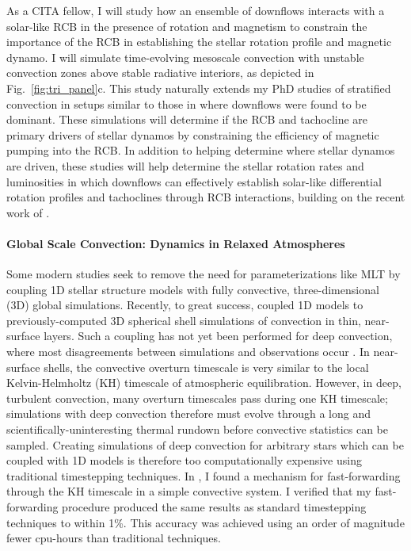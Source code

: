 \documentclass[preprint, hmargin=1in, vmargin=1in]{aastex62}
\begin{document}
As a CITA fellow, I will study how an ensemble of downflows interacts with a solar-like RCB in the presence of rotation and magnetism to constrain the importance of the RCB in establishing the stellar rotation profile and magnetic dynamo.
I will simulate time-evolving mesoscale convection with unstable convection zones above stable radiative interiors, as depicted in Fig.~\ref{fig:tri_panel}c.
This study naturally extends my PhD studies of stratified convection \citep{anders&brown2017, anders&all2019} in setups similar to those in \citet{kapyla&all2017} where downflows were found to be dominant. 
These simulations will determine if the RCB and tachocline are primary drivers of stellar dynamos by constraining the efficiency of magnetic pumping into the RCB.
In addition to helping determine where stellar dynamos are driven, these studies will help determine the stellar rotation rates and luminosities in which downflows can effectively establish solar-like differential rotation profiles and tachoclines through RCB interactions, building on the recent work of \citet{wood&brummell2018}.

\paragraph{Global Scale Convection: Dynamics in Relaxed Atmospheres}
Some modern studies seek to remove the need for parameterizations like MLT by coupling 1D stellar structure models with fully convective, three-dimensional (3D) global simulations.
Recently, to great success, \citet{jorgensen&weiss2019} coupled 1D models to previously-computed 3D spherical shell simulations of convection in thin, near-surface layers.
Such a coupling has not yet been performed for deep convection, where most disagreements between simulations and observations occur \citep[the Convective Conundrum,][]{hanasoge&all2015}.
In near-surface shells, the convective overturn timescale is very similar to the local Kelvin-Helmholtz (KH) timescale of atmospheric equilibration.
However, in deep, turbulent convection, many overturn timescales pass during one KH timescale; simulations with deep convection therefore must evolve through a long and scientifically-uninteresting thermal rundown before convective statistics can be sampled.
Creating simulations of deep convection for arbitrary stars which can be coupled with 1D models is therefore too computationally expensive using traditional timestepping techniques.
In \citet{anders&all2018}, I found a mechanism for fast-forwarding through the KH timescale in a simple convective system.
I verified that my fast-forwarding procedure produced the same results as standard timestepping techniques to within 1\%.
This accuracy was achieved using an order of magnitude fewer cpu-hours than traditional techniques.
\end{document}

